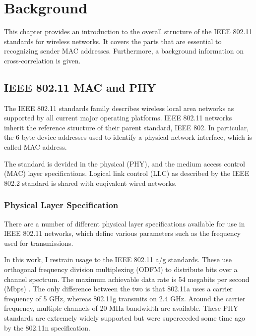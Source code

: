 
\chapter{Background}\label{ch:relatedwork}
\glsresetall %

This chapter provides an introduction to the overall structure of the IEEE 802.11 standards for wireless networks. It covers the parts that are essential to recognizing sender MAC addresses. Furthermore, a background information on cross-correlation is given.



\section{IEEE 802.11 MAC and PHY} \label{sec:mac-and-phy}

The IEEE 802.11 standards family describes wireless local area networks as supported by all current major operating platforms. IEEE 802.11 networks inherit the reference structure of their parent standard, IEEE 802. In particular, the 6 byte device addresses used to identify a physical network interface, which is called MAC address.

The standard is devided in the physical (PHY), and the medium access control (MAC) layer specifications. Logical link control (LLC) as described by the IEEE 802.2 standard is shared with euqivalent wired networks.


\subsection{Physical Layer Specification}

There are a number of different physical layer specifications available for use in IEEE 802.11 networks, which define various parameters such as the frequency used for transmissions.

In this work, I restrain usage to the IEEE 802.11 a/g standards. These use orthogonal frequency division multiplexing (ODFM) to distribute bits over a channel spectrum. The maximum achievable data rate is 54 megabits per second (Mbps) \cite{ieee2012}. The only difference between the two is that 802.11a uses a carrier frequency of 5 GHz, whereas 802.11g transmits on 2.4 GHz. Around the carrier frequency, multiple channels of 20 MHz bandwidth are available. These PHY standards are extremely widely supported but were superceeded some time ago by the 802.11n specification.


